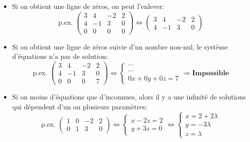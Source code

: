 \begin{remark}
\begin{itemize}
\item Si on obtient une ligne de zéros, on peut l'enlever:
\[\text{p.ex. }  \left(\begin{array}{ccc|c} 3 & 4 & -2 & 2 \\ 4 & -1 & 3 & 0 \\ 0 & 0 & 0 & 0 \end{array}\right) \Leftrightarrow  \left(\begin{array}{ccc|c} 3 & 4 & -2 & 2 \\ 4 & -1 & 3 & 0 \end{array}\right) \]
\item Si on obtient une ligne de zéros suivie d'un nombre non-nul, le système d'équations n'a pas de solution:
\[\text{p.ex. }  \left(\begin{array}{ccc|c} 3 & 4 & -2 & 2 \\ 4 & -1 & 3 & 0 \\ 0 & 0 & 0 & 7 \end{array}\right) \Leftrightarrow  \begin{cases} \cdots \\ \cdots \\ 0x + 0y + 0z = 7 \end{cases} \Rightarrow \textbf{Impossible} \]
\item Si on moins d'équations que d'inconnues, alors il y a une infinité de solutions qui dépendent d'un ou plusieurs paramètres:
\[\text{p.ex. }  \left(\begin{array}{ccc|c} 1 & 0 & -2 & 2 \\ 0 & 1 & 3 & 0 \end{array}\right) \Leftrightarrow  \begin{cases} x - 2z = 2 \\ y + 3z = 0 \end{cases} \Leftrightarrow  \begin{cases} x = 2 + 2\lambda \\ y = -3\lambda \\ z = \lambda \end{cases} \]
\end{itemize}
\end{remark}

